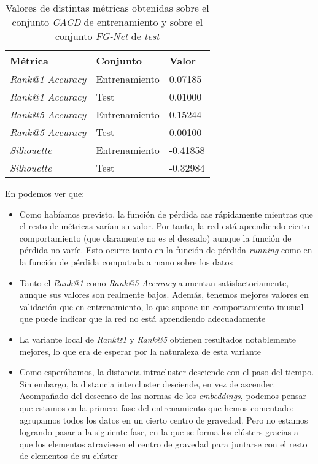 \begin{table}[!hbtp]
\centering
\begin{tabular}{|l|l|l|}
    \hline
    Métrica & Conjunto & Valor \\
    \hline

    \textit{Rank@1 Accuracy} & Entrenamiento & 0.07185 \\
    \textit{Rank@1 Accuracy} & Test & 0.01000 \\
    \textit{Rank@5 Accuracy} & Entrenamiento & 0.15244 \\
    \textit{Rank@5 Accuracy} & Test & 0.00100 \\
    \textit{Silhouette} & Entrenamiento & -0.41858 \\
    \textit{Silhouette} & Test & -0.32984 \\

    \hline

\end{tabular}
\caption{Valores de distintas métricas obtenidas sobre el conjunto \textit{CACD} de entrenamiento y sobre el conjunto \textit{FG-Net} de \textit{test}}
    \label{table:resultados_sobre_fg_net}
\end{table}

En  podemos ver que:

\begin{itemize}
    \item Como habíamos previsto, la función de pérdida cae rápidamente mientras que el resto de métricas varían su valor. Por tanto, la red está aprendiendo cierto comportamiento (que claramente no es el deseado) aunque la función de pérdida no varíe. Esto ocurre tanto en la función de pérdida \textit{running} como en la función de pérdida computada a mano sobre los datos
    \item Tanto el \textit{Rank@1} como \textit{Rank@5 Accuracy} aumentan satisfactoriamente, aunque sus valores son realmente bajos. Además, tenemos mejores valores en validación que en entrenamiento, lo que supone un comportamiento inusual que puede indicar que la red no está aprendiendo adecuadamente
    \item La variante local de \textit{Rank@1} y \textit{Rank@5} obtienen resultados notablemente mejores, lo que era de esperar por la naturaleza de esta variante
    \item Como esperábamos, la distancia intracluster desciende con el paso del tiempo. Sin embargo, la distancia intercluster desciende, en vez de ascender. Acompañado del descenso de las normas de los \textit{embeddings}, podemos pensar que estamos en la primera fase del entrenamiento que hemos comentado: agrupamos todos los datos en un cierto centro de gravedad. Pero no estamos logrando pasar a la siguiente fase, en la que se forma los clústers gracias a que los elementos atraviesen el centro de gravedad para juntarse con el resto de elementos de su clúster
\end{itemize}

